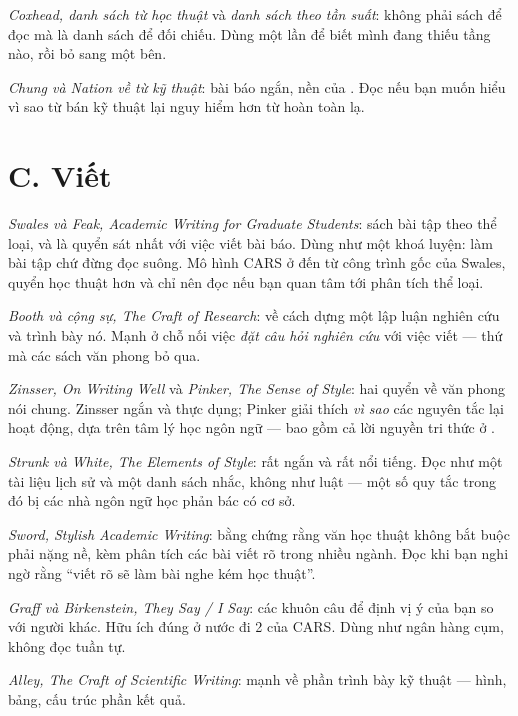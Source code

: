 \documentclass[english.tex]{subfiles}
\begin{document}
\emph{Coxhead, danh sách từ học thuật}\cite{coxhead2000} và \emph{danh sách theo tần suất}\cite{ngsl}: không phải sách để đọc mà là danh sách để đối chiếu. Dùng một lần để biết mình đang thiếu tầng nào, rồi bỏ sang một bên.

\emph{Chung và Nation về từ kỹ thuật}\cite{chungnation2003}: bài báo ngắn, nền của . Đọc nếu bạn muốn hiểu vì sao từ bán kỹ thuật lại nguy hiểm hơn từ hoàn toàn lạ.

\section*{C. Viết}

\emph{Swales và Feak, \emph{Academic Writing for Graduate Students}}\cite{swalesfeak2012}: sách bài tập theo thể loại, và là quyển sát nhất với việc viết bài báo. Dùng như một khoá luyện: làm bài tập chứ đừng đọc suông. Mô hình CARS ở  đến từ công trình gốc của Swales\cite{swales1990}, quyển học thuật hơn và chỉ nên đọc nếu bạn quan tâm tới phân tích thể loại.

\emph{Booth và cộng sự, \emph{The Craft of Research}}\cite{booth2016}: về cách dựng một lập luận nghiên cứu và trình bày nó. Mạnh ở chỗ nối việc \emph{đặt câu hỏi nghiên cứu} với việc viết --- thứ mà các sách văn phong bỏ qua.

\emph{Zinsser, \emph{On Writing Well}}\cite{zinsser2006} và \emph{Pinker, \emph{The Sense of Style}}\cite{pinker2014}: hai quyển về văn phong nói chung. Zinsser ngắn và thực dụng; Pinker giải thích \emph{vì sao} các nguyên tắc lại hoạt động, dựa trên tâm lý học ngôn ngữ --- bao gồm cả lời nguyền tri thức ở .

\emph{Strunk và White, \emph{The Elements of Style}}\cite{strunkwhite1999}: rất ngắn và rất nổi tiếng. Đọc như một tài liệu lịch sử và một danh sách nhắc, không như luật --- một số quy tắc trong đó bị các nhà ngôn ngữ học phản bác có cơ sở.

\emph{Sword, \emph{Stylish Academic Writing}}\cite{sword2012}: bằng chứng rằng văn học thuật không bắt buộc phải nặng nề, kèm phân tích các bài viết rõ trong nhiều ngành. Đọc khi bạn nghi ngờ rằng ``viết rõ sẽ làm bài nghe kém học thuật''.

\emph{Graff và Birkenstein, \emph{They Say / I Say}}\cite{graff2021}: các khuôn câu để định vị ý của bạn so với người khác. Hữu ích đúng ở nước đi 2 của CARS. Dùng như ngân hàng cụm, không đọc tuần tự.

\emph{Alley, \emph{The Craft of Scientific Writing}}\cite{alley2018}: mạnh về phần trình bày kỹ thuật --- hình, bảng, cấu trúc phần kết quả.
\end{document}
